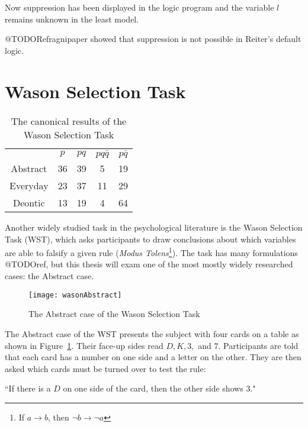 Now suppression has been displayed in the logic program and the variable $l$ remains unknown in the least model.

@TODORefragnipaper showed that suppression is not possible in Reiter's default logic.

\section{Wason Selection Task}
\begin{table}
\begin{center}


\begin{tabular}{ c c c c c}
  & \textbf{$p$} & \textbf{$pq$} & \textbf{$pq\bar{q}$} & \textbf{$p\bar{q}$}\\ 
 Abstract & 36 & 39 & 5 & 19\\  
 Everyday & 23 & 37 & 11 & 29\\  
 Deontic & 13 & 19 & 4 & 64
\end{tabular}
\caption{The canonical results of the Wason Selection Task}
\label{tbl:can}
\end{center}
\end{table}


Another widely studied task in the psychological literature is the Wason Selection Task (WST), which asks participants to draw conclusions about which variables are able to falsify a given rule (\textit{Modus Tolens}\footnote{If $a\rightarrow b$, then $\lnot b \rightarrow \lnot a$}). The task has many formulations @TODOref, but this thesis will exam one of the most mostly widely researched cases: the Abstract case. 

\begin{figure}
\begin{center}
\texttt{[image: wasonAbstract]}
\label{fig:wst}
\caption{The Abstract case of the Wason Selection Task}
\end{center}

\end{figure}

The Abstract case of the WST presents the subject with four cards on a table as shown in Figure~\ref{fig:wst}. Their face-up sides read $D, K, 3,$ and $7$. Participants are told that each card has a number on one side and a letter on the other. They are then asked which cards must be turned over to test the rule:

\begin{center}
``If there is a $D$ on one side of the card, then the other side shows $3$."
\end{center} 


